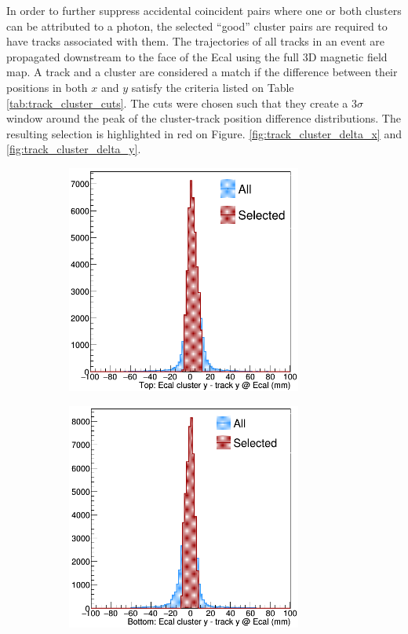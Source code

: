 In order to further suppress accidental coincident pairs where one or both
clusters can be attributed to a photon, the 
selected ``good'' cluster pairs are required to have tracks associated 
with them. The trajectories of all tracks in an event are propagated downstream
to the face of the Ecal using the full 3D magnetic field map.  A track and a cluster
are considered a match if the difference between their positions in both $x$ 
and $y$ satisfy the criteria listed on Table \ref{tab:track_cluster_cuts}. The 
cuts were chosen such that they create a 3$\sigma$ window around the peak of 
the cluster-track position difference distributions. The resulting selection is 
highlighted in red on 
Figure. \ref{fig:track_cluster_delta_x} and \ref{fig:track_cluster_delta_y}.
\begin{figure}[h]
    \begin{subfigure}{.5\textwidth}
        \centering
        \includegraphics[width=0.85\textwidth]{images/20160502_pass4_cluster_track_delta_y_top.png}
    \end{subfigure}
    \begin{subfigure}{.5\textwidth}
        \centering
        \includegraphics[width=0.85\textwidth]{images/20160502_pass4_cluster_track_delta_y_bottom.png}

\end{subfigure}
\end{figure}
